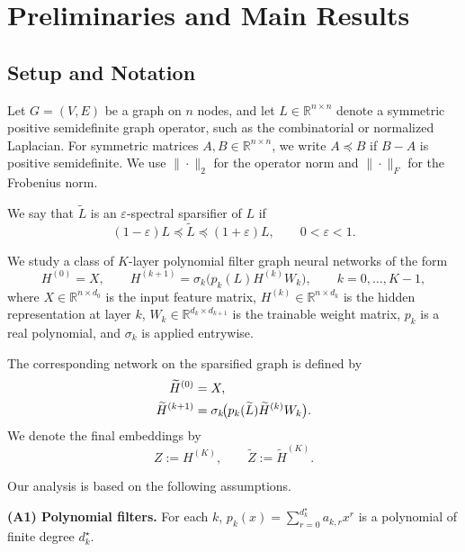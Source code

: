 \documentclass{article}
\begin{document}
\section{Preliminaries and Main Results}
\label{sec:main_results}

\subsection{Setup and Notation}

Let $G=(V,E)$ be a graph on $n$ nodes, and let $L \in \mathbb{R}^{n\times n}$ denote a symmetric positive semidefinite graph operator, such as the combinatorial or normalized Laplacian. For symmetric matrices $A,B \in \mathbb{R}^{n\times n}$, we write $A \preceq B$ if $B-A$ is positive semidefinite. We use $\|\cdot\|_2$ for the operator norm and $\|\cdot\|_F$ for the Frobenius norm.

We say that $\widetilde L$ is an $\varepsilon$-spectral sparsifier of $L$ if
\begin{equation}
(1-\varepsilon)L \preceq \widetilde L \preceq (1+\varepsilon)L,
\qquad 0<\varepsilon<1.
\label{eq:spectral_sparsifier}
\end{equation}

We study a class of $K$-layer polynomial filter graph neural networks of the form
\begin{equation}
H^{(0)} = X, \qquad
H^{(k+1)} = \sigma_k\!\bigl(p_k(L)H^{(k)}W_k\bigr),
\qquad k=0,\dots,K-1,
\label{eq:gnn_forward}
\end{equation}
where $X \in \mathbb{R}^{n\times d_0}$ is the input feature matrix, $H^{(k)} \in \mathbb{R}^{n\times d_k}$ is the hidden representation at layer $k$, $W_k \in \mathbb{R}^{d_k\times d_{k+1}}$ is the trainable weight matrix, $p_k$ is a real polynomial, and $\sigma_k$ is applied entrywise.

The corresponding network on the sparsified graph is defined by
\begin{align}
\widetilde H^{(0)} &= X, \notag\\
\widetilde H^{(k+1)}
&= \sigma_k\!\bigl(p_k(\widetilde L)\widetilde H^{(k)}W_k\bigr).
\label{eq:sparse_gnn_forward}
\end{align}
We denote the final embeddings by
\[
Z := H^{(K)},
\qquad
\widetilde Z := \widetilde H^{(K)}.
\]

Our analysis is based on the following assumptions.

\textbf{(A1) Polynomial filters.}
For each $k$, $p_k(x)=\sum_{r=0}^{d_k^\star} a_{k,r}x^r$ is a polynomial of finite degree $d_k^\star$.
\end{document}
